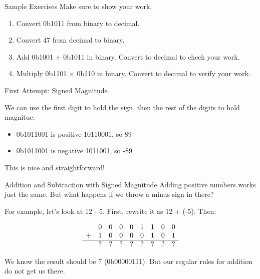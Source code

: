 \begin{frame}{Sample Exercises}
Make sure to show your work.
\vfill 
\begin{enumerate}
    \item Convert 0b1011 from binary to decimal. 
    \vfill
    \item Convert 47 from decimal to binary.
    \vfill
    \item Add 0b1001 + 0b1011 in binary. Convert to decimal to check your work.
    \vfill
    \item Multiply 0b1101 $\times$ 0b110 in binary. Convert to decimal to verify your work.
    \vfill 
\end{enumerate}
\end{frame}


\begin{frame}{First Attempt: Signed Magnitude}

We can use the first digit to hold the sign, then the rest of the digits to hold magnitue:

    \begin{itemize}
        \item 0b1011001 is positive 10110001, so 89
        \item 0b1011001 is negative 1011001, so -89 
    \end{itemize}

This is nice and straightforward!

\end{frame}

\begin{frame}{Addition and Subtraction with Signed Magnitude}
    Adding positive numbers works just the same. But what happens if we throw a minus sign in there?
    
    For example, let's look at 12 - 5. First, rewrite it as 12 + (-5). Then: 

    \[
\begin{array}{ccccccccc}
      & 0 & 0 & 0 & 0 & 1 & 1 & 0 & 0 \\ 
    + & 1 & 0 & 0 & 0 & 0 & 1 & 0 & 1 \\
    \hline
      & ? & ? & ? & ? & ? & ? & ? & ? \\ 
\end{array}
\]

We know the result should be 7 (0b00000111). But our regular rules for addition do not get us there.
\end{frame}


